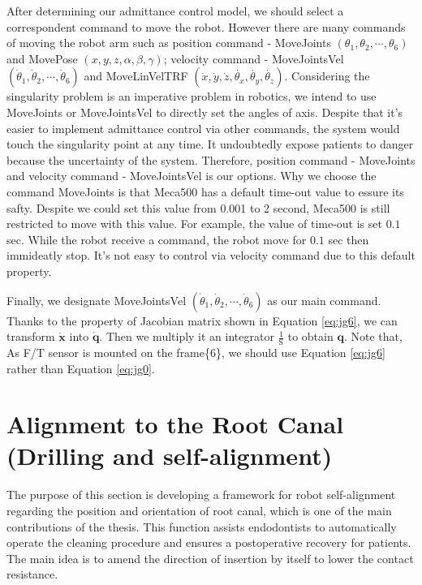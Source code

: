 After determining our admittance control model, we should select a correspondent command to move the robot. However there are many commands of moving the robot arm such as position command - MoveJoints $\left(\theta _1, \theta _2,\cdots , \theta _6 \right)$ and MovePose $\left(x,y,z,\alpha ,\beta ,\gamma \right)$; velocity command - MoveJointsVel $\left(\dot{\theta}_1, \dot{\theta}_2,\cdots , \dot{\theta}_6 \right)$ and MoveLinVelTRF $\left(\dot{x},\dot{y},\dot{z},\dot{\theta _x},\dot{\theta _y},\dot{\theta _z}\right)$. Considering the singularity problem is an imperative problem in robotics, we intend to use MoveJoints or MoveJointsVel to directly set the angles of axis. Despite that it's easier to implement admittance control via other commands, the system would touch the singularity point at any time. It undoubtedly expose patients to danger because the uncertainty of the system. Therefore, position command - MoveJoints and velocity command - MoveJointsVel is our options. Why we choose the command MoveJoints  is that Meca500 has a default time-out value to essure its safty. Despite we could set this value from 0.001 to 2 second, Meca500 is still restricted to move with this value. For example, the value of time-out is set $0.1$ sec. While the robot receive a command, the robot move for $0.1$ sec then immideatly stop. It's not easy to control via velocity command due to this default property.

Finally, we designate MoveJointsVel $\left(\dot{\theta}_1, \dot{\theta}_2,\cdots , \dot{\theta}_6 \right)$ as our main command. Thanks to the property of Jacobian matrix shown in Equation \ref{eq:jg6}, we can transform $\boldsymbol{\dot{x}}$ into $\boldsymbol{\dot{q}}$. Then we multiply it an integrator $\frac{1}{\mathrm{S}}$
to obtain $\boldsymbol{q}$. Note that, As F/T sensor is mounted on the frame\{6\}, we should use Equation \ref{eq:jg6} rather than Equation \ref{eq:jg0}. 
\section{Alignment to the Root Canal (Drilling and self-alignment)}
The purpose of this section is developing a framework for robot self-alignment regarding the position and orientation of root canal, which is one of the main contributions of the thesis. This function assists endodontists to automatically operate the cleaning procedure and ensures a postoperative recovery for patients. The main idea is to amend the direction of insertion by itself to lower the contact resistance.


